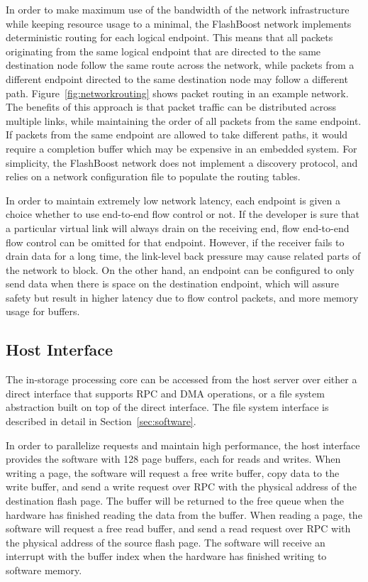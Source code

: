 In order to make maximum use of the bandwidth of the network infrastructure
while keeping resource usage to a minimal, the FlashBoost network implements
deterministic routing for each logical endpoint. This means that all packets
originating from the same logical endpoint that are directed to the same
destination node follow the same route across the network, while packets from a
different endpoint directed to the same destination node may follow a different
path. Figure~\ref{fig:networkrouting} shows packet routing in an example
network. The benefits of this approach is that packet traffic can be distributed
across multiple links, while maintaining the order of all packets from the same
endpoint. If packets from the same endpoint are allowed to take different paths,
it would require a completion buffer which may be expensive in an embedded
system.
For simplicity, the FlashBoost network does not implement a discovery protocol, and relies on a
network configuration file to populate the routing tables. 

In order to maintain extremely low network latency, each endpoint is given a
choice whether to use end-to-end flow control or not. If the developer is sure
that a particular virtual link will always drain on the receiving end, flow
end-to-end flow control can be omitted for that endpoint. However, if the
receiver fails to drain data for a long time, the link-level back pressure may
cause related parts of the network to block. On the other hand, an endpoint can
be configured to only send data when there is space on the destination endpoint,
which will assure safety but result in higher latency due to flow control
packets, and more memory usage for buffers.

\subsection{Host Interface}

The in-storage processing core can be accessed from the host server over either
a direct interface that supports RPC and DMA operations, or a file system
abstraction built on top of the direct interface. The file system interface is
described in detail in Section~\ref{sec:software}.

In order to parallelize requests and maintain high performance, the host
interface provides the software with 128 page buffers, each for reads and
writes. When writing a page, the software will request a free write buffer, copy
data to the write buffer, and send a write request over RPC with the
physical address of the destination flash page.
The buffer will be returned to the free queue when the
hardware has finished reading the data from the buffer. When reading a page, the
software will request a free read buffer, and send a read request over RPC with
the physical address of the source flash page. The software will receive an
interrupt with the buffer index when the hardware has finished writing to
software memory.

